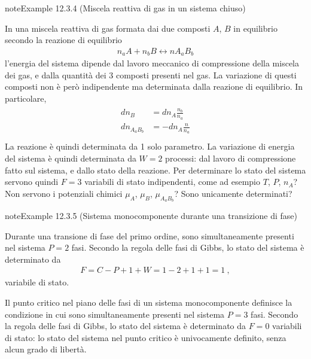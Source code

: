 \documentclass[letterpaper,10pt,italian]{jupyterBook}
\begin{document}
\label{ch/thermodynamics/principles-gibbs-phase-rule:example-7}
\begin{sphinxadmonition}{note}{Example 12.3.4 (Miscela reattiva di gas in un sistema chiuso)}



\sphinxAtStartPar
In una miscela reattiva di gas formata dai due composti \(A\), \(B\) in equilibrio secondo la reazione di equilibrio
\begin{equation*}
\begin{split}n_a A + n_b B \leftrightarrow n A_a B_b\end{split}
\end{equation*}
\sphinxAtStartPar
l’energia del sistema dipende dal lavoro meccanico di compressione della miscela dei gas, e dalla quantità dei 3 composti presenti nel gas. La variazione di questi composti non è però indipendente ma determinata dalla reazione di equilibrio. In particolare,
\begin{equation*}
\begin{split}\begin{aligned}
  d n_{B} & = d n_{A} \frac{n_b}{n_a} \\
  d n_{A_a B_b} & = - d n_{A} \frac{n}{n_a} \\
\end{aligned}\end{split}
\end{equation*}
\sphinxAtStartPar
La reazione è quindi determinata da 1 solo parametro. La variazione di energia del sistema è quindi determinata da \(W=2\) processi: dal lavoro di compressione fatto sul sistema, e dallo stato della reazione. Per determinare lo stato del sistema servono quindi \(F=3\) variabili di stato indipendenti, come ad esempio  \(T\), \(P\), \(n_A\)? Non servono i potenziali chimici \(\mu_A\), \(\mu_B\), \(\mu_{A_a B_b}\)? Sono unicamente determinati?
\end{sphinxadmonition}
\label{ch/thermodynamics/principles-gibbs-phase-rule:example-8}
\begin{sphinxadmonition}{note}{Example 12.3.5 (Sistema monocomponente durante una transizione di fase)}



\sphinxAtStartPar
{} Durante una transione di fase del primo ordine, sono simultaneamente presenti nel sistema \(P = 2\) fasi. Secondo la regola delle fasi di Gibbs, lo stato del sistema è determinato da
\begin{equation*}
\begin{split}F = C - P + 1 + W = 1 - 2 + 1 + 1 = 1 \ ,\end{split}
\end{equation*}
\sphinxAtStartPar
variabile di stato.

\sphinxAtStartPar
{} Il punto critico nel piano delle fasi di un sistema mono\sphinxhyphen{}componente definisce la condizione in cui sono simultaneamente presenti nel sistema \(P = 3\) fasi. Secondo la regola delle fasi di Gibbs, lo stato del sistema è determinato da \(F = 0\) variabili di stato: lo stato del sistema nel punto critico è univocamente definito, senza alcun grado di libertà.
\end{sphinxadmonition}
\end{document}
